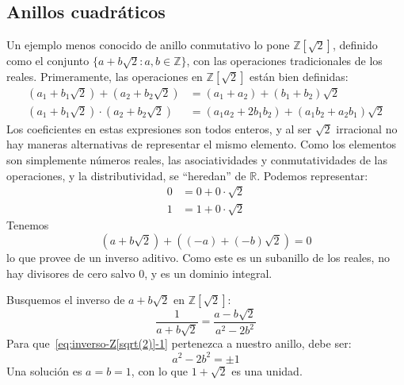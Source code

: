 

\subsection{Anillos cuadráticos}
\label{sec:anillos-cuadraticos}

  Un ejemplo menos conocido de anillo conmutativo lo pone
  \(\mathbb{Z}[\sqrt{2}]\),%
  definido como el conjunto \(\{a + b \sqrt{2} \colon a, b \in \mathbb{Z}\}\),
  con las operaciones tradicionales de los reales.
  Primeramente,
  las operaciones en \(\mathbb{Z}[\sqrt{2}]\) están bien definidas:
  \begin{align*}
    (a_1 + b_1 \sqrt{2}) + (a_2 + b_2 \sqrt{2})
      &= (a_1 + a_2) + (b_1 + b_2) \sqrt{2} \\
    (a_1 + b_1 \sqrt{2}) \cdot (a_2 + b_2 \sqrt{2})
      &= (a_1 a_2 + 2 b_1 b_2) + (a_1 b_2 + a_2 b_1) \sqrt{2}
  \end{align*}
  Los coeficientes en estas expresiones son todos enteros,
  y al ser \(\sqrt{2}\) irracional no hay maneras alternativas%
  de representar el mismo elemento.
  Como los elementos son simplemente números reales,
  las asociatividades y conmutatividades de las operaciones,
  y la distributividad,
  se ``heredan'' de  \(\mathbb{R}\).%
  Podemos representar:
  \begin{align*}
    0 &= 0 + 0 \cdot \sqrt{2} \\
    1 &= 1 + 0 \cdot \sqrt{2}
  \end{align*}
  Tenemos
  \begin{equation*}
    \left(a + b \sqrt{2}\right) + \left((-a) + (-b) \sqrt{2}\right)
      = 0
  \end{equation*}
  lo que provee de un inverso aditivo.
  Como este es un subanillo de los reales,
  no hay divisores de cero salvo \(0\),
  y es un dominio integral.%

  Busquemos el inverso de \(a + b \sqrt{2}\) en \(\mathbb{Z}[\sqrt{2}]\):
  \begin{equation}
    \label{eq:inverso-Z[sqrt(2)]-1}
    \frac{1}{a + b \sqrt{2}}
      = \frac{a - b \sqrt{2}}{a^2 - 2 b^2}
  \end{equation}
  Para que~\eqref{eq:inverso-Z[sqrt(2)]-1} pertenezca a nuestro anillo,
  debe ser:
  \begin{equation}
    \label{eq:inverso-Z[sqrt(2)]-2}
    a^2 - 2 b^2
      = \pm 1
  \end{equation}
  Una solución es \(a = b = 1\),
  con lo que \(1 + \sqrt{2}\) es una unidad.

